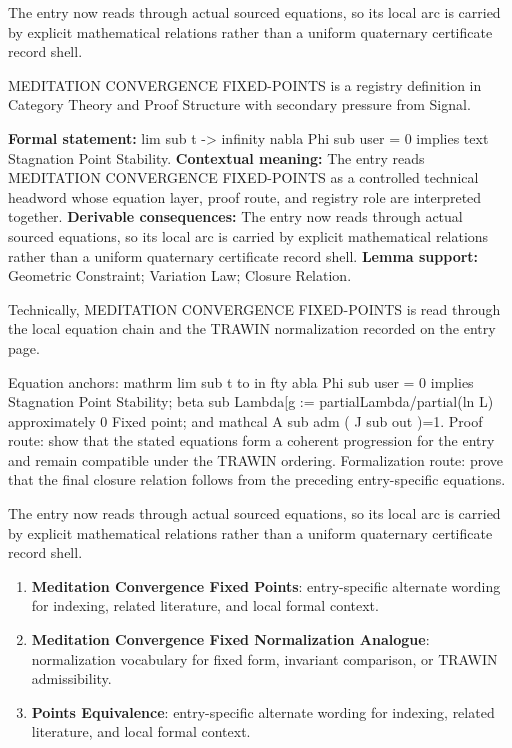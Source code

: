 The entry now reads through actual sourced equations, so its local arc is carried by explicit mathematical relations rather than a uniform quaternary certificate record shell.
\clearpage


\begingroup\small
{}
MEDITATION CONVERGENCE FIXED-POINTS is a registry definition in Category Theory and Proof Structure with secondary pressure from Signal.

\begingroup\footnotesize\setlength{\emergencystretch}{3em}\sloppy
\textbf{Formal statement:} lim sub t -> infinity nabla Phi sub user = 0 implies text Stagnation Point Stability. \textbf{Contextual meaning:} The entry reads MEDITATION CONVERGENCE FIXED-POINTS as a controlled technical headword whose equation layer, proof route, and registry role are interpreted together. \textbf{Derivable consequences:} The entry now reads through actual sourced equations, so its local arc is carried by explicit mathematical relations rather than a uniform quaternary certificate record shell. \textbf{Lemma support:} Geometric Constraint; Variation Law; Closure Relation.\par
\endgroup

Technically, MEDITATION CONVERGENCE FIXED-POINTS is read through the local equation chain and the TRAWIN normalization recorded on the entry page.

Equation anchors: mathrm lim sub t to in fty abla Phi sub user = 0 implies Stagnation Point Stability; beta sub Lambda[g := partialLambda/partial(ln L) approximately 0 Fixed point; and mathcal A sub adm ( J sub out )=1. Proof route: show that the stated equations form a coherent progression for the entry and remain compatible under the TRAWIN ordering. Formalization route: prove that the final closure relation follows from the preceding entry-specific equations.

The entry now reads through actual sourced equations, so its local arc is carried by explicit mathematical relations rather than a uniform quaternary certificate record shell.
\endgroup

\begin{enumerate}[leftmargin=1.6em,itemsep=6pt,topsep=4pt]
\item \textbf{Meditation Convergence Fixed Points}: entry-specific alternate wording for indexing, related literature, and local formal context.
\item \textbf{Meditation Convergence Fixed Normalization Analogue}: normalization vocabulary for fixed form, invariant comparison, or TRAWIN admissibility.
\item \textbf{Points Equivalence}: entry-specific alternate wording for indexing, related literature, and local formal context.
\end{enumerate}

